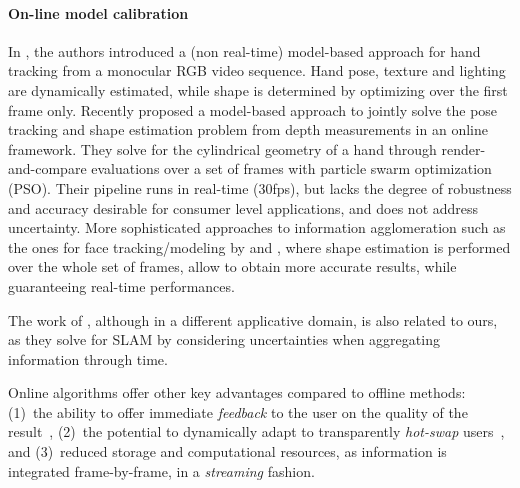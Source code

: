 \paragraph{On-line model calibration}
In \cite{delagorce2011model}, the authors introduced a (non real-time) model-based approach for hand tracking from a monocular RGB video sequence. Hand pose, texture and lighting are dynamically estimated, while shape is determined by optimizing over the first frame only.
Recently  proposed a model-based approach to jointly solve the pose tracking and shape estimation problem from depth measurements in an online framework. They solve for the cylindrical geometry of a hand through render-and-compare evaluations over a set of frames with particle swarm optimization (PSO). Their pipeline runs in real-time (30fps), but lacks the degree of robustness and accuracy desirable for consumer level applications, and does not address uncertainty.
More sophisticated approaches to information agglomeration such as the ones for face tracking/modeling by  and , where shape estimation is performed over the whole set of frames, allow to obtain more accurate results, while guaranteeing real-time performances.
\begin{edit}
The work of , although in a different applicative domain, is also related to ours, as they solve for SLAM by considering uncertainties when aggregating information through time.
\end{edit}
\begin{edit}
Online algorithms offer other key advantages compared to offline methods: (1)~the ability to offer immediate \emph{feedback} to the user on the quality of the result~\cite{kinfu}, (2)~the potential to dynamically adapt to transparently \emph{hot-swap} users~\cite{bouaziz2013online}, and (3)~reduced storage and computational resources, as information is integrated frame-by-frame, in a \emph{streaming} fashion.
\end{edit}

